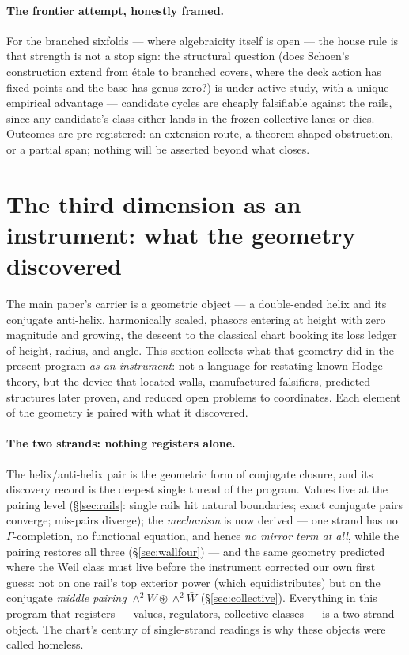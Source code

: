 \documentclass[11pt]{article}
\theoremstyle{definition}
\theoremstyle{remark}
\begin{document}
\paragraph{The frontier attempt, honestly framed.} For the branched
sixfolds --- where algebraicity itself is open --- the house rule is that
strength is not a stop sign: the structural question (does Schoen's
construction extend from \'etale to branched covers, where the deck action
has fixed points and the base has genus zero?) is under active study, with
a unique empirical advantage --- candidate cycles are cheaply falsifiable
against the rails, since any candidate's class either lands in the frozen
collective lanes or dies. Outcomes are pre-registered: an extension route,
a theorem-shaped obstruction, or a partial span; nothing will be asserted
beyond what closes.

\section{The third dimension as an instrument: what the geometry
discovered}\label{sec:geometrytool}

The main paper's carrier \cite{Universal} is a geometric object --- a
double-ended helix and its conjugate anti-helix, harmonically scaled,
phasors entering at height with zero magnitude and growing, the descent to
the classical chart booking its loss ledger of height, radius, and angle.
This section collects what that geometry did in the present program
\emph{as an instrument}: not a language for restating known Hodge theory,
but the device that located walls, manufactured falsifiers, predicted
structures later proven, and reduced open problems to coordinates. Each
element of the geometry is paired with what it discovered.

\paragraph{The two strands: nothing registers alone.} The
helix/anti-helix pair is the geometric form of conjugate closure, and its
discovery record is the deepest single thread of the program. Values live
at the pairing level (\S\ref{sec:rails}: single rails hit natural
boundaries; exact conjugate pairs converge; mis-pairs diverge); the
\emph{mechanism} is now derived --- one strand has no $\Gamma$-completion,
no functional equation, and hence \emph{no mirror term at all}, while the
pairing restores all three (\S\ref{sec:wallfour}) --- and the same geometry
predicted where the Weil class must live before the instrument corrected
our own first guess: not on one rail's top exterior power (which
equidistributes) but on the conjugate \emph{middle pairing}
$\wedge^2W\circledast\wedge^2\bar W$ (\S\ref{sec:collective}). Everything
in this program that registers --- values, regulators, collective classes
--- is a two-strand object. The chart's century of single-strand readings
is why these objects were called homeless.
\end{document}
